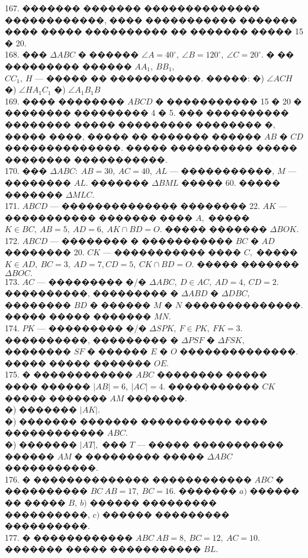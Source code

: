 \documentclass[12pt]{article}
\begin{document}
167. ������� ������� �������������� ������������, ���� ����������� ������� ���� ����� ���������� �� ������� ����� 15 � 20.\\
168. ��� $\Delta ABC$ � ������ $\angle A=40^\circ,\ \angle B=120^\circ,\ \angle C=20^\circ.$ � �� ��������� ������ $AA_1,\ BB_1,$\\$ CC_1,\ H$ --- ����� �� �����������. �����: �) $\angle ACH$ �) $\angle HA_1C_1$ �) $\angle A_1B_1B$\\
169. ���� �������� $ABCD$ � ����������� 15 � 20 � �������� ��������� 4 � 5. ��� ���������� �������� ����� ��������� �������� �, ����� ����, ����� �� ������� ������ $AB$ � $CD$ ��������������. ����� ���������� ����� �������� �����������.\\
170. ��� $\Delta ABC:\ AB=30,\ AC=40,\ AL$ --- �����������, $M$ --- �������� $AL.$ ������� $\Delta BML$ ����� 60. ����� ������� $\Delta MLC.$\\
171. $ABCD$ --- �������������� �������� 22. $AK$ --- ����������� ������� ���� $A,$ ����� $K\in BC,\ AB=5,\ AD=6,\ AK\cap BD=O.$ ����� ������� $\Delta BOK.$\\
172. $ABCD$ --- �������� � ����������� $BC$ � $AD$ �������� 20. $CK$ --- ����������� ���� $C,$ ����� $K\in AD,\ BC=3,\ AD=7, CD=5,\ CK\cap BD=O.$ ����� ������� $\Delta BOC.$\\
173. $AC$ --- ��������� �/� $\Delta ABC,\ D\in AC,\ AD=4,\ CD=2.$ ����������, ��������� � $\Delta ABD$ � $\Delta DBC,$ �������� $BD$ � ������ $M$ � $N$ ��������������. ����� ����� ������� $MN.$\\
174. $PK$ --- ��������� �/� $\Delta SPK,\ F\in PK,\ FK=3.$ ����������, ��������� � $\Delta PSF$ � $\Delta FSK,$ �������� $SF$ � ������ $E$ � $O$ ��������������. ����� ����� ������� $OE.$\\
175. � ������������ $ABC$ �������� ����� ���� ������ $|AB|=6,\ |AC|=4.$ ����������� $CK$ ����� ������� $AM$ �������.\\
�) ������� $|AK|.$\\
�) ������� ������� ����������� ���� ������������ $ABC.$\\
�) ������� $|AT|,$ ��� $T$ --- ����� ����������� ������ $AM$ � ��������� ����� $\Delta ABC$ �����������.\\
176. � �������������� ������������ $ABC$ � ���������� $BC\ AB=17,\ BC=16.$ ������� $a)$ ������ �� ����� $B,\ b)$ ������ ��������� ����������, $c)$ ������ ��������� ����������.\\
177. � ������������ $ABC\ AB=8,\ BC=12,\ AC=10.$ ������� ����� ����������� $BL.$\\
\end{document}
